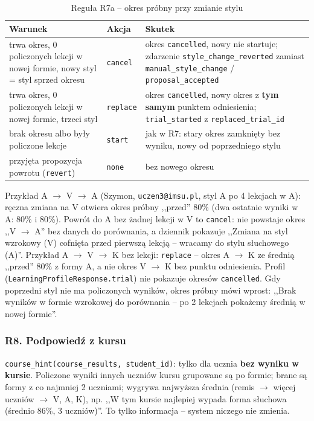 \begin{table}[H]
\centering
\small
\begin{tabular}{|p{5.6cm}|l|p{6.2cm}|}
\hline
\textbf{Warunek} & \textbf{Akcja} & \textbf{Skutek} \\ \hline
trwa okres, 0 policzonych lekcji w nowej formie, nowy styl = styl sprzed okresu & \texttt{cancel} & okres \texttt{cancelled}, nowy nie startuje; zdarzenie \texttt{style\_change\_reverted} zamiast \texttt{manual\_style\_change} / \texttt{proposal\_accepted} \\ \hline
trwa okres, 0 policzonych lekcji w nowej formie, trzeci styl & \texttt{replace} & okres \texttt{cancelled}, nowy okres z \textbf{tym samym} punktem odniesienia; \texttt{trial\_started} z \texttt{replaced\_trial\_id} \\ \hline
brak okresu albo były policzone lekcje & \texttt{start} & jak w R7: stary okres zamknięty bez wyniku, nowy od poprzedniego stylu \\ \hline
przyjęta propozycja powrotu (\texttt{revert}) & \texttt{none} & bez nowego okresu \\ \hline
\end{tabular}
\caption{Reguła R7a -- okres próbny przy zmianie stylu}
\end{table}

Przykład A $\to$ V $\to$ A (Szymon, \texttt{uczen3@imsu.pl}, styl A po 4 lekcjach w A): ręczna zmiana na V otwiera okres próbny ,,przed'' 80\% (dwa ostatnie wyniki w A: 80\% i 80\%). Powrót do A bez żadnej lekcji w V to \texttt{cancel}: nie powstaje okres ,,V $\to$ A'' bez danych do porównania, a dziennik pokazuje ,,Zmiana na styl wzrokowy (V) cofnięta przed pierwszą lekcją -- wracamy do stylu słuchowego (A)''. Przykład A $\to$ V $\to$ K bez lekcji: \texttt{replace} -- okres A $\to$ K ze średnią ,,przed'' 80\% z formy A, a nie okres V $\to$ K bez punktu odniesienia. Profil (\texttt{LearningProfileResponse.trial}) nie pokazuje okresów \texttt{cancelled}. Gdy poprzedni styl nie ma policzonych wyników, okres próbny mówi wprost: ,,Brak wyników w formie wzrokowej do porównania -- po 2 lekcjach pokażemy średnią w nowej formie''.

\subsubsection{R8. Podpowiedź z kursu}
\texttt{course\_hint(course\_results, student\_id)}: tylko dla ucznia \textbf{bez wyniku w kursie}. Policzone wyniki innych uczniów kursu grupowane są po formie; brane są formy z co najmniej 2 uczniami; wygrywa najwyższa średnia (remis $\to$ więcej uczniów $\to$ V, A, K), np. ,,W tym kursie najlepiej wypada forma słuchowa (średnio 86\%, 3 uczniów)''. To tylko informacja -- system niczego nie zmienia.

